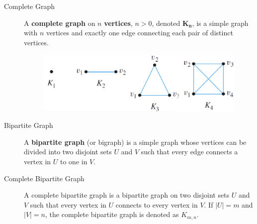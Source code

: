 \documentclass{article}
\begin{document}
\begin{description}
    \item[Complete Graph] A \textbf{complete graph} on $n$ \textbf{vertices}, $n > 0$, denoted $\mathbf{K_{n}}$, is a simple graph with $n$ vertices and exactly one edge connecting each pair of distinct vertices. 
    
    \begin{figure}[H]
		\centering
		\includegraphics[scale=0.5]{complete_graph} 
	\end{figure}
	
    \item[Bipartite Graph] A \textbf{bipartite graph} (or bigraph) is a simple graph whose vertices can be divided into two disjoint sets $U$ and $V$ such that every edge connects a vertex in $U$ to one in $V$.
    \item[Complete Bipartite Graph] A complete bipartite graph is a bipartite graph on two disjoint sets $U$ and $V$ such that every vertex in $U$ connects to every vertex in $V$. If $|U|=m$ and $|V|=n$, the complete bipartite graph is denoted as $K_{m, n}$.
    

\end{description}
\end{document}
